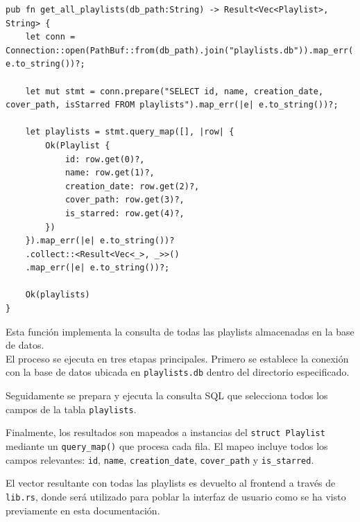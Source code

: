 \documentclass[11pt, a4paper]{article}
\begin{document}
            \begin{lstlisting}[caption={fn get\_all\_playlists()}]
pub fn get_all_playlists(db_path:String) -> Result<Vec<Playlist>, String> {
    let conn = Connection::open(PathBuf::from(db_path).join("playlists.db")).map_err(|e| e.to_string())?;

    let mut stmt = conn.prepare("SELECT id, name, creation_date, cover_path, isStarred FROM playlists").map_err(|e| e.to_string())?;

    let playlists = stmt.query_map([], |row| {
        Ok(Playlist {
            id: row.get(0)?,
            name: row.get(1)?,
            creation_date: row.get(2)?,
            cover_path: row.get(3)?,
            is_starred: row.get(4)?,
        })
    }).map_err(|e| e.to_string())?
    .collect::<Result<Vec<_>, _>>()
    .map_err(|e| e.to_string())?;

    Ok(playlists)
}
            \end{lstlisting}

            Esta función implementa la consulta de todas las playlists almacenadas en la base de datos. \\

            El proceso se ejecuta en tres etapas principales. Primero se establece la conexión con la base de datos ubicada en \texttt{playlists.db} dentro del directorio especificado.

            Seguidamente se prepara y ejecuta la consulta SQL que selecciona todos los campos de la tabla \texttt{playlists}.

            Finalmente, los resultados son mapeados a instancias del \texttt{struct Playlist} mediante un \texttt{query\_map()} que procesa cada fila. El mapeo incluye todos los campos relevantes: \texttt{id}, \texttt{name}, \texttt{creation\_date}, \texttt{cover\_path} y \texttt{is\_starred}.

            El vector resultante con todas las playlists es devuelto al frontend a través de \texttt{lib.rs}, donde será utilizado para poblar la interfaz de usuario como se ha visto previamente en esta documentación.
\end{document}
